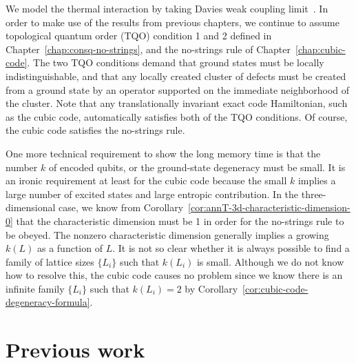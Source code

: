 We model the thermal interaction by taking Davies weak coupling limit~\cite{Davies1974}.
In order to make use of the results from previous chapters,
we continue to assume topological quantum order (TQO) condition 1 and 2 
defined in Chapter~\ref{chap:consq-no-strings},
and the no-strings rule of Chapter~\ref{chap:cubic-code}.
The two TQO conditions demand that ground states must be locally indistinguishable,
and that any locally created cluster of defects must be created from a ground state
by an operator supported on the immediate neighborhood of the cluster.
Note that any translationally invariant exact code Hamiltonian, such as the cubic code,
automatically satisfies both of the TQO conditions.
Of course, the cubic code satisfies the no-strings rule.

One more technical requirement to show the long memory time is that the number $k$ of encoded qubits,
or the ground-state degeneracy must be small.
It is an ironic requirement at least for the cubic code
because the small $k$ implies a large number of excited states and large entropic contribution.
In the three-dimensional case, we know from Corollary~\ref{cor:annT-3d-characteristic-dimension-0}
that the characteristic dimension must be 1 in order for the no-strings rule to be obeyed.
The nonzero characteristic dimension generally implies a growing $k(L)$ as a function of $L$.
It is not so clear whether it is always possible to find a family of lattice sizes $\{ L_i \}$
such that $k(L_i)$ is small.
Although we do not know how to resolve this, the cubic code causes no problem since we know
there is an infinite family $\{L_i\}$ such that $k(L_i) = 2$ 
by Corollary~\ref{cor:cubic-code-degeneracy-formula}.


\section{Previous work}


